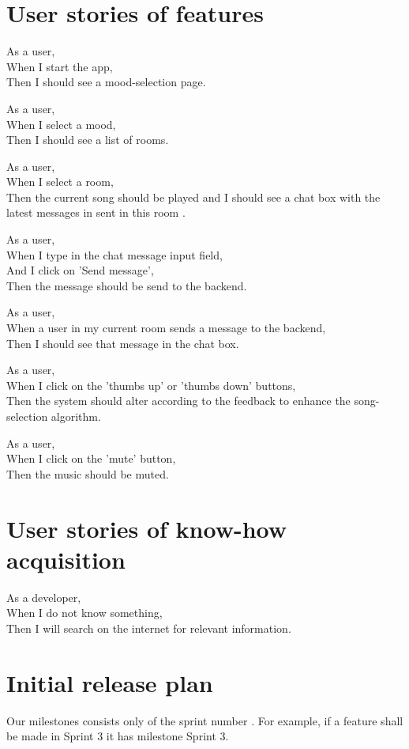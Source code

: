\section{User stories of features}
As a user,\\
When I start the app,\\
Then I should see a mood-selection page.

As a user,\\
When I select a mood,\\
Then I should see a list of rooms.

As a user,\\
When I select a room,\\
Then the current song should be played and I should see a chat box with the latest messages in sent in this room .

As a user,\\
When I type in the chat message input field,\\
And I click on 'Send message',\\
Then the message should be send to the backend.

As a user,\\
When a user in my current room sends a message to the backend,\\
Then I should see that message in the chat box.

As a user,\\
When I click on the 'thumbs up' or 'thumbs down' buttons,\\
Then the system should alter according to the feedback to enhance the song-selection algorithm.

As a user,\\
When I click on the 'mute' button,\\
Then the music should be muted.

\section{User stories of know-how acquisition}
As a developer, \\
When I do not know something, \\
Then I will search on the internet for relevant information.

\section{Initial release plan}
Our milestones consists only of the sprint number .
For example, if a feature shall be made in Sprint 3 it has milestone Sprint 3. 

